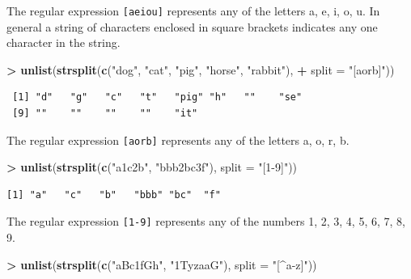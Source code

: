 \documentclass[]{krantz}
\makeatletter
\newenvironment{Shaded}{\begin{snugshade}}{\end{snugshade}}
\newcommand{\KeywordTok}[1]{\textcolor[rgb]{0.27,0.27,0.27}{\textbf{#1}}}
\newcommand{\DataTypeTok}[1]{\textcolor[rgb]{0.27,0.27,0.27}{#1}}
\newcommand{\StringTok}[1]{\textcolor[rgb]{0.5,0.5,0.5}{#1}}
\newcommand{\OperatorTok}[1]{\textcolor[rgb]{0.43,0.43,0.43}{\textbf{#1}}}
\newcommand{\NormalTok}[1]{#1}
\newenvironment{kframe}{%
\medskip{}
\setlength{\fboxsep}{.8em}
 \def\at@end@of@kframe{}%
 \ifinner\ifhmode%
  \def\at@end@of@kframe{\end{minipage}}%
  \begin{minipage}{\columnwidth}%
 \fi\fi%
 \def\FrameCommand##1{\hskip\@totalleftmargin \hskip-\fboxsep
 \colorbox{shadecolor}{##1}\hskip-\fboxsep
     \hskip-\linewidth \hskip-\@totalleftmargin \hskip\columnwidth}%
 \MakeFramed {\advance\hsize-\width
   \@totalleftmargin\z@ \linewidth\hsize
   \@setminipage}}%
 {\par\unskip\endMakeFramed%
 \at@end@of@kframe}
\renewenvironment{Shaded}{\begin{kframe}}{\end{kframe}}
\makeatother
\begin{document}
The regular expression \texttt{{[}aeiou{]}} represents any of the
letters a, e, i, o, u. In general a string of characters enclosed in
square brackets indicates any one character in the string.

\begin{Shaded}
\begin{Highlighting}[]
\OperatorTok{>}\StringTok{ }\KeywordTok{unlist}\NormalTok{(}\KeywordTok{strsplit}\NormalTok{(}\KeywordTok{c}\NormalTok{(}\StringTok{"dog"}\NormalTok{, }\StringTok{"cat"}\NormalTok{, }\StringTok{"pig"}\NormalTok{, }\StringTok{"horse"}\NormalTok{, }\StringTok{"rabbit"}\NormalTok{), }
\OperatorTok{+}\StringTok{                 }\DataTypeTok{split =} \StringTok{"[aorb]"}\NormalTok{))}
\end{Highlighting}
\end{Shaded}

\begin{verbatim}
 [1] "d"   "g"   "c"   "t"   "pig" "h"   ""    "se" 
 [9] ""    ""    ""    ""    "it" 
\end{verbatim}

The regular expression \texttt{{[}aorb{]}} represents any of the letters
a, o, r, b.

\begin{Shaded}
\begin{Highlighting}[]
\OperatorTok{>}\StringTok{ }\KeywordTok{unlist}\NormalTok{(}\KeywordTok{strsplit}\NormalTok{(}\KeywordTok{c}\NormalTok{(}\StringTok{"a1c2b"}\NormalTok{, }\StringTok{"bbb2bc3f"}\NormalTok{), }\DataTypeTok{split =} \StringTok{"[1-9]"}\NormalTok{))}
\end{Highlighting}
\end{Shaded}

\begin{verbatim}
[1] "a"   "c"   "b"   "bbb" "bc"  "f"  
\end{verbatim}

The regular expression \texttt{{[}1-9{]}} represents any of the numbers
1, 2, 3, 4, 5, 6, 7, 8, 9.

\begin{Shaded}
\begin{Highlighting}[]
\OperatorTok{>}\StringTok{ }\KeywordTok{unlist}\NormalTok{(}\KeywordTok{strsplit}\NormalTok{(}\KeywordTok{c}\NormalTok{(}\StringTok{"aBc1fGh"}\NormalTok{, }\StringTok{"1TyzaaG"}\NormalTok{), }\DataTypeTok{split =} \StringTok{"[^a-z]"}\NormalTok{))}
\end{Highlighting}
\end{Shaded}
\end{document}
